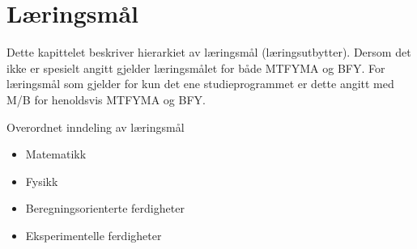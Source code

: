 \chapter{Læringsmål}
\label{c:los} %

Dette kapittelet beskriver hierarkiet av læringsmål (læringsutbytter). Dersom det ikke er spesielt angitt gjelder læringsmålet for både MTFYMA og BFY. For læringsmål som gjelder for kun det ene studieprogrammet er dette angitt med M/B for henoldsvis MTFYMA og BFY.

Overordnet inndeling av læringsmål

\begin{itemize}
	\item Matematikk
	\item Fysikk
	\item Beregningsorienterte ferdigheter
	\item Eksperimentelle ferdigheter
\end{itemize}




